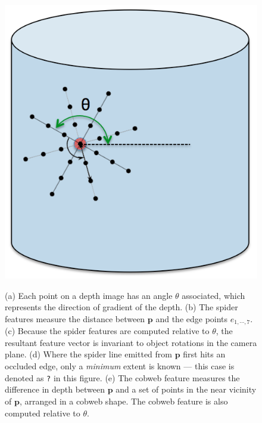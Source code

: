 \documentclass[10pt,twocolumn,letterpaper]{article}
\newcommand{\point}{\mathbf{p}}
\begin{document}
\begin{figure}
{        \includegraphics[width=\subwidth]{05_cobweb}}
        \hfill
    \caption{
    (a) Each point on a depth image has an angle $\theta$ associated, which represents the direction of gradient of the depth. 
    (b) The spider features measure the distance between $\point$ and the edge points $e_{1, \cdots, 7}$.
    (c) Because the spider features are computed relative to $\theta$, the resultant feature vector is invariant to object rotations in the camera plane.
    (d) Where the spider line emitted from $\point$ first hits an occluded edge, only a \textit{minimum} extent is known --- this case is denoted as \texttt{?} in this figure.
    (e) The cobweb feature measures the difference in depth between $\point$ and a set of points in the near vicinity of $\point$, arranged in a cobweb shape.
    The cobweb feature is also computed relative to $\theta$.}%
    \label{fig:features}
\end{figure}
\end{document}
